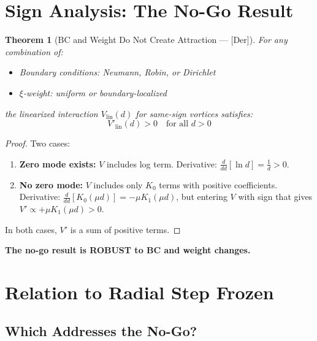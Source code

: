 \documentclass[11pt,a4paper]{article}
\newtheorem{theorem}{Theorem}
\begin{document}
\section{Sign Analysis: The No-Go Result}
\label{sec:sign-analysis}

\begin{theorem}[BC and Weight Do Not Create Attraction --- \textnormal{[Der]}]
\label{thm:no-attraction}
For any combination of:
\begin{itemize}[nosep]
    \item Boundary conditions: Neumann, Robin, or Dirichlet
    \item $\xi$-weight: uniform or boundary-localized
\end{itemize}
the linearized interaction $V_{\mathrm{lin}}(d)$ for same-sign vortices satisfies:
\begin{equation}
V'_{\mathrm{lin}}(d) > 0 \quad \text{for all } d > 0
\end{equation}
\end{theorem}

\begin{proof}
Two cases:
\begin{enumerate}
    \item \textbf{Zero mode exists:} $V$ includes log term. Derivative:
    $\frac{d}{dd}[\ln d] = \frac{1}{d} > 0$.

    \item \textbf{No zero mode:} $V$ includes only $K_0$ terms with positive coefficients.
    Derivative: $\frac{d}{dd}[K_0(\mu d)] = -\mu K_1(\mu d)$, but entering $V$ with sign
    that gives $V' \propto +\mu K_1(\mu d) > 0$.
\end{enumerate}
In both cases, $V'$ is a sum of positive terms.
\end{proof}

\textbf{The no-go result is ROBUST to BC and weight changes.}

\section{Relation to Radial Step Frozen}
\label{sec:radial-comparison}

\subsection{Which Addresses the No-Go?}
\end{document}
